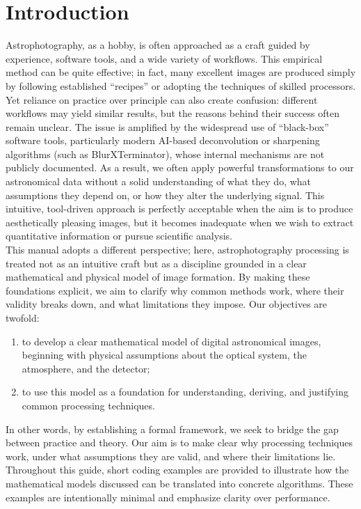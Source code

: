 \section{Introduction}

Astrophotography, as a hobby, is often approached as a craft guided by experience, software tools, and a wide variety of workflows.
This empirical method can be quite effective; in fact, many excellent images are produced simply by following established ``recipes'' or adopting the techniques of skilled processors.
Yet reliance on practice over principle can also create confusion: different workflows may yield similar results, but the reasons behind their success often remain unclear.
The issue is amplified by the widespread use of “black-box” software tools, particularly modern AI-based deconvolution or sharpening algorithms (such as BlurXTerminator), whose internal mechanisms are not publicly documented.
As a result, we often apply powerful transformations to our astronomical data without a solid understanding of what they do, what assumptions they depend on, or how they alter the underlying signal.
This intuitive, tool-driven approach is perfectly acceptable when the aim is to produce aesthetically pleasing images, but it becomes inadequate when we wish to extract quantitative information or pursue scientific analysis.
\\[\baselineskip]
This manual adopts a different perspective; here, astrophotography processing is treated not as an intuitive craft but as a discipline grounded in a clear mathematical and physical model of image formation.
By making these foundations explicit, we aim to clarify why common methods work, where their validity breaks down, and what limitations they impose.
Our objectives are twofold:
\begin{enumerate}
    \item to develop a clear mathematical model of digital astronomical images, beginning with physical assumptions about the optical system, the atmosphere, and the detector;
    \item to use this model as a foundation for understanding, deriving, and justifying common processing techniques.
\end{enumerate}
In other words, by establishing a formal framework, we seek to bridge the gap between practice and theory.
Our aim is to make clear why processing techniques work, under what assumptions they are valid, and where their limitations lie.
\\[\baselineskip]
Throughout this guide, short coding examples are provided to illustrate how the mathematical models discussed can be translated into concrete algorithms.
These examples are intentionally minimal and emphasize clarity over performance.
